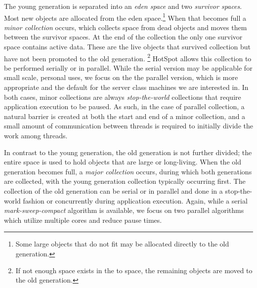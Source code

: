\documentclass{sig-alternate}
\begin{document}
The young generation is separated into an \textit{eden space} and two \textit{survivor spaces}. Most new objects are allocated from the eden space.\footnote{Some large objects that do not fit may be allocated directly to the old generation.} When that becomes full a \textit{minor collection} occurs, which collects space from dead objects and moves them between the survivor spaces. At the end of the collection the only one survivor space contains active data. These are the live objects that survived collection but have not been promoted to the old generation. \footnote{If not enough space exists in the to space, the remaining objects are moved to the old generation.} HotSpot allows this collection to be performed serially or in parallel. While the serial version may be applicable for small scale, personal uses, we focus on the the parallel version, which is more appropriate and the default for the server class machines we are interested in. In both cases, minor collections are always \textit{stop-the-world} collections that require application execution to be paused. As such, in the case of parallel collection, a natural barrier is created at both the start and end of a minor collection, and a small amount of communication between threads is required to initially divide the work among threads.

In contrast to the young generation, the old generation is not further divided; the entire space is used to hold objects that are large or long-living. When the old generation becomes full, a \textit{major collection} occurs, during which both generations are collected, with the young generation collection typically occurring first. The collection of the old generation can be serial or in parallel and done in a stop-the-world fashion or concurrently during application execution. Again, while a serial \textit{mark-sweep-compact} algorithm is available, we focus on two parallel algorithms which utilize multiple cores and reduce pause times.
\end{document}
